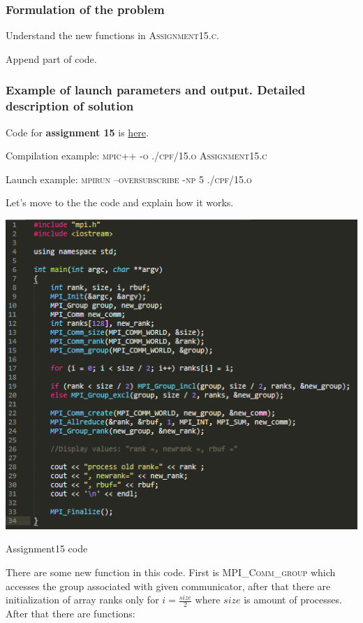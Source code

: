 \documentclass[%
12pt, %
final, %
oneside, %
onecolumn, %
centertags]{article} %
\theoremstyle{plain}
\theoremstyle{definition}
\theoremstyle{remark}
\begin{document}
\subsubsection{Formulation of the problem}

Understand the new functions in \textsc{Assignment15.c}.

Append part of code.

\subsubsection{Example of launch parameters and output. Detailed description of solution}

Code for \textbf{assignment 15} is \href{https:\//github.com/aptmess/parallel_algorithms/blob/master/HT/hw_mpi/Assignment15.c}{here}.

Compilation example: \textsc{mpic++ -o ./cpf/15.o Assignment15.c}

Launch example: \textsc{mpirun --oversubscribe -np 5 ./cpf/15.o}

Let's move to the the code and explain how it works.

\begin{center}
\includegraphics[scale=0.87]{15.code.png}

Assignment15 code
\end{center}

There are some new function in this code. First is \textsc{MPI\_Comm\_group} which accesses the group associated with given communicator, after that there are initialization of array ranks only for $i = \frac{size}{2}$ where $size$ is amount of processes. After that there are functions:
\end{document}
